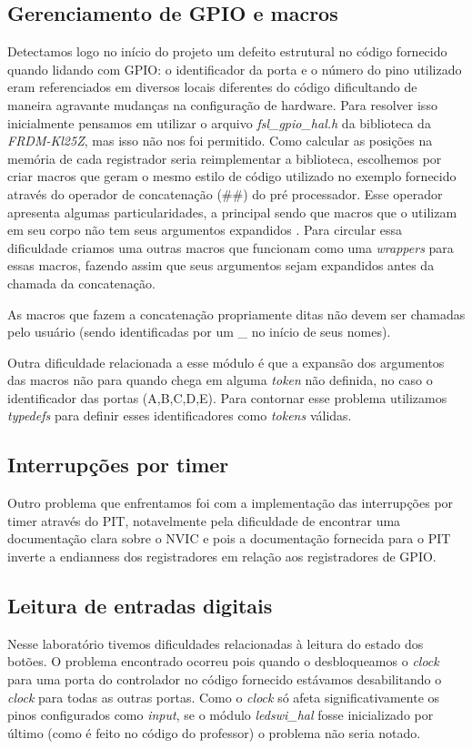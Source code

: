 \documentclass{article}
\begin{document}
\subsection{Gerenciamento de GPIO e macros}
Detectamos logo no início do projeto um defeito estrutural no código fornecido quando lidando com GPIO: o identificador da porta e o número do pino utilizado eram referenciados em diversos locais diferentes do código dificultando de maneira agravante mudanças na configuração de hardware. Para resolver isso inicialmente pensamos em utilizar o arquivo \textit{fsl\_gpio\_hal.h} da biblioteca da \textit{FRDM-Kl25Z}, mas isso não nos foi permitido. Como calcular as posições na memória de cada registrador seria reimplementar a biblioteca, escolhemos por criar macros que geram o mesmo estilo de código utilizado no exemplo fornecido através do operador de concatenação (\#\#) do pré processador. Esse operador apresenta algumas particularidades, a principal sendo que macros que o utilizam em seu corpo não tem seus argumentos expandidos \cite{bb:preprocessor}. Para circular essa dificuldade criamos uma outras macros que funcionam como uma \textit{wrappers} para essas macros, fazendo assim que seus argumentos sejam expandidos antes da chamada da concatenação. 

As macros que fazem a concatenação propriamente ditas não devem ser chamadas pelo usuário (sendo identificadas por um \_ no início de seus nomes).

Outra dificuldade relacionada a esse módulo é que a expansão dos argumentos das macros não para quando chega em alguma \textit{token} não definida, no caso o identificador das portas (A,B,C,D,E). Para contornar esse problema utilizamos \textit{typedefs} para definir esses identificadores como \textit{tokens} válidas.

\subsection{Interrupções por timer}
Outro problema que enfrentamos foi com a implementação das interrupções por timer através do PIT, notavelmente pela dificuldade de encontrar uma documentação clara sobre o NVIC e pois a documentação fornecida para o PIT inverte a endianness dos registradores em relação aos registradores de GPIO.

\subsection{Leitura de entradas digitais}
Nesse laboratório tivemos dificuldades relacionadas à leitura do estado dos botões. O problema encontrado ocorreu pois quando o desbloqueamos o \textit{clock} para uma porta do controlador no código fornecido estávamos desabilitando o \textit{clock} para todas as outras portas. Como o \textit{clock} só afeta significativamente os pinos configurados como \textit{input}, se o módulo \textit{ledswi\_hal} fosse inicializado por último (como é feito no código do professor) o problema não seria notado.
\end{document}
